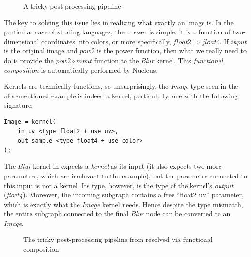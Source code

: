 \begin{figure}[ht!]
  \centering
    \caption[A tricky post-processing pipeline]{A tricky post-processing pipeline}
  \label{fig:TrickyPostProc}
\end{figure}

The key to solving this issue lies in realizing what exactly an image is. In the particular case of shading languages, the answer is simple: it is a function of two-dimensional coordinates into colors, or more specifically, $float2 \Rightarrow float4$. If $input$ is the original image and $pow2$ is the power function, then what we really need to do is provide the $pow2 \circ input$ function to the \emph{Blur} kernel. This \emph{functional composition} is automatically performed by Nucleus.

Kernels are technically functions, so unsurprisingly, the \emph{Image} type seen in the aforementioned example is indeed a kernel; particularly, one with the following signature:
	
\noindent\begin{minipage}{\textwidth}
\begin{lstlisting}[frame=single]
Image = kernel(
    in uv <type float2 + use uv>,
    out sample <type float4 + use color>
);
\end{lstlisting}
\end{minipage}

The \emph{Blur} kernel in  expects a \emph{kernel} as its input (it also expects two more parameters, which are irrelevant to the example), but the parameter connected to this input is not a kernel. Its type, however, is the type of the kernel's \emph{output} (\emph{float4}). Moreover, the incoming subgraph contains a free ``float2 uv'' parameter, which is exactly what the \emph{Image} kernel needs. Hence despite the type mismatch, the entire subgraph connected to the final \emph{Blur} node can be converted to an \emph{Image}.

\begin{figure}[ht!]
  \centering
    \caption[The tricky post-processing pipeline resolved]{The tricky post-processing pipeline from  resolved via functional composition}
  \label{fig:TrickyPostProcResolve}
\end{figure}

